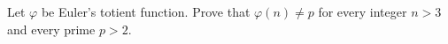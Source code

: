 Let $\varphi$ be Euler's totient function. Prove that $\varphi(n)\ne p$ for every integer $n>3$ and every prime $p>2$.
